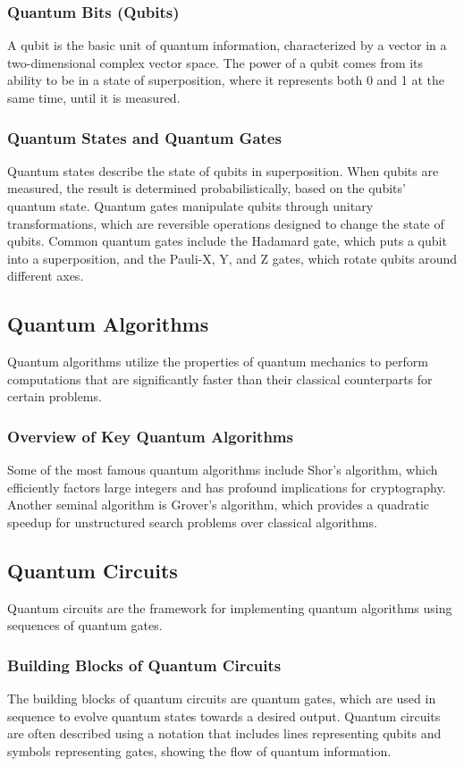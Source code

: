 \documentclass{book}
\begin{document}
\subsubsection{Quantum Bits (Qubits)}
A qubit is the basic unit of quantum information, characterized by a vector in a two-dimensional complex vector space. The power of a qubit comes from its ability to be in a state of superposition, where it represents both 0 and 1 at the same time, until it is measured.

\subsubsection{Quantum States and Quantum Gates}
Quantum states describe the state of qubits in superposition. When qubits are measured, the result is determined probabilistically, based on the qubits' quantum state. Quantum gates manipulate qubits through unitary transformations, which are reversible operations designed to change the state of qubits. Common quantum gates include the Hadamard gate, which puts a qubit into a superposition, and the Pauli-X, Y, and Z gates, which rotate qubits around different axes.

\subsection{Quantum Algorithms}
Quantum algorithms utilize the properties of quantum mechanics to perform computations that are significantly faster than their classical counterparts for certain problems.

\subsubsection{Overview of Key Quantum Algorithms}
Some of the most famous quantum algorithms include Shor's algorithm, which efficiently factors large integers and has profound implications for cryptography. Another seminal algorithm is Grover's algorithm, which provides a quadratic speedup for unstructured search problems over classical algorithms.

\subsection{Quantum Circuits}
Quantum circuits are the framework for implementing quantum algorithms using sequences of quantum gates.

\subsubsection{Building Blocks of Quantum Circuits}
The building blocks of quantum circuits are quantum gates, which are used in sequence to evolve quantum states towards a desired output. Quantum circuits are often described using a notation that includes lines representing qubits and symbols representing gates, showing the flow of quantum information.
\end{document}
